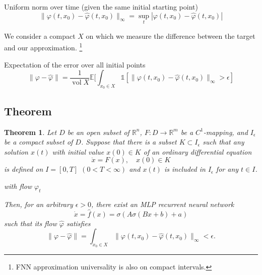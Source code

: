 \documentclass{article}
\newtheorem{theorem}{Theorem}
\theoremstyle{definition}
\theoremstyle{remark}
\newcommand{\vol}{\operatorname{vol}}
\begin{document}
Uniform norm over time (given the same initial starting point)
\begin{equation}
\|\varphi(t,x_0)-\hat \varphi(t,x_0)\|_\infty = \sup_t|\varphi(t,x_0)-\hat \varphi(t,x_0)|
\end{equation}

We consider a compact $X$ on which we measure the difference between the target and our approximation.
\footnote{FNN approximation universality is also on compact intervals.}

Expectation of the error over all initial points
\begin{equation}
\|\varphi-\hat \varphi\| = \frac{1}{\vol X}\mathbb{E}[ \int_{x_0\in X}   \mathbb{1}[\|\varphi(t,x_0)-\hat \varphi(t,x_0)\|_\infty>\epsilon]
\end{equation}




\subsection{Theorem}
\begin{theorem}
Let $D$ be an open subset of $\mathbb{R}^n$, $F : D \to \mathbb{R}^m$ be a $C^1$-mapping, and $I_\epsilon$ be a compact subset of $D$.
Suppose that there is a subset $K \subset I_\epsilon$ such that any solution $x(t)$ with initial value $x(0) \in K$ of an ordinary differential equation
\begin{equation}\label{eq:5}
    \dot{x} = F(x), \quad x(0) \in K
\end{equation}
is defined on $I = [0, T]$ $(0 < T < \infty)$ and $x(t)$ is included in $I_\epsilon$ for any $t \in I$.

with flow $\varphi_t$ 


 Then, for an arbitrary $\epsilon > 0$, there exist an MLP recurrent neural network 
 \begin{equation}
\dot x = \hat f(x) = \sigma(A\sigma(Bx+b)+a)
\end{equation}
such that its flow $\hat \varphi$ satisfies
\begin{equation}
\|\varphi-\hat \varphi\| = \int_{x_0\in X}\|\varphi(t,x_0)-\hat \varphi(t,x_0)\|_\infty<\epsilon.
\end{equation}
\end{theorem}
\end{document}
